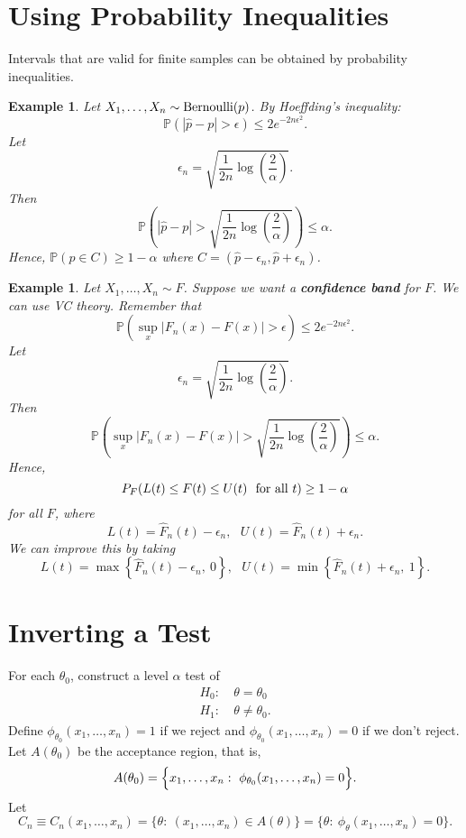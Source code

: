 \documentclass[twoside,12pt]{article}
\newtheorem{example}[theorem]{Example}
\begin{document}
\section{Using Probability Inequalities}

Intervals that are valid for finite samples can be obtained by
probability inequalities.

\begin{example}
Let $X_1,\ldots, X_n \sim {\rm Bernoulli}(p)$.
By Hoeffding's inequality:
$$
\mathbb{P}(|\widehat p - p | > \epsilon) \leq 2 e^{-2n\epsilon^2}.
$$
Let
$$
\epsilon_n = \sqrt{\frac{1}{2n}\log\left(\frac{2}{\alpha}\right)}.
$$
Then
$$
\mathbb{P}\left( | \widehat{p}-p| > \sqrt{\frac{1}{2n}\log\left(\frac{2}{\alpha}\right)}\right)\leq \alpha.
$$
Hence,
$\mathbb{P}(p\in C)\ge 1-\alpha$ where
$C=(\widehat p -\epsilon_n,\widehat p +\epsilon_n)$.
\end{example}

\begin{example}
Let $X_1,\ldots, X_n \sim F$.
Suppose we want a 
{\bf confidence band} for $F$.
We can use VC theory.
Remember that
$$
\mathbb{P}\left(\sup_x | F_n(x) - F(x)| > \epsilon\right)\leq 2 e^{- 2n\epsilon^2}.
$$
Let
$$
\epsilon_n = \sqrt{\frac{1}{2n}\log\left(\frac{2}{\alpha}\right)}.
$$
Then
$$
\mathbb{P}\left(\sup_x | F_n(x) - F(x)| > \sqrt{\frac{1}{2n}\log\left(\frac{2}{\alpha}\right)}\right)\leq \alpha.
$$
Hence,
$$
P_F(L(t) \leq F(t)\leq U(t)\ \ {\rm for\ all\ }t) \geq 1-\alpha
$$
for all $F$, where
$$
L(t) = \widehat{F}_n(t) -\epsilon_n,\ \ \ 
U(t) = \widehat{F}_n(t) +\epsilon_n.
$$
We can improve this by taking
$$
L(t) = \max\left\{\widehat{F}_n(t) -\epsilon_n,\ 0\right\},\ \ \ 
U(t) = \min\left\{\widehat{F}_n(t) +\epsilon_n,\ 1\right\}.
$$
\end{example}

\section{Inverting a Test}

For each $\theta_0$, construct a level $\alpha$ test 
of
\begin{align*}
H_0:&~ \theta= \theta_0 \\
H_1:&~\theta \neq \theta_0.
\end{align*}
Define 
$\phi_{\theta_0}(x_1,\ldots, x_n) =1$ if we reject and
$\phi_{\theta_0}(x_1,\ldots, x_n) =0$ if we don't reject.
Let $A(\theta_0)$ be the acceptance region, that is,
$$
A(\theta_0) = \Bigl\{x_1,\ldots, x_n:\ \phi_{\theta_0}(x_1,\ldots, x_n)=0\Bigr\}.
$$
Let
$$
C_n \equiv C_n(x_1,\ldots, x_n) = 
\{ \theta:\ (x_1,\ldots, x_n) \in A(\theta)\} = 
\{ \theta:\ \phi_\theta(x_1,\ldots, x_n) =0\}.
$$
\end{document}
